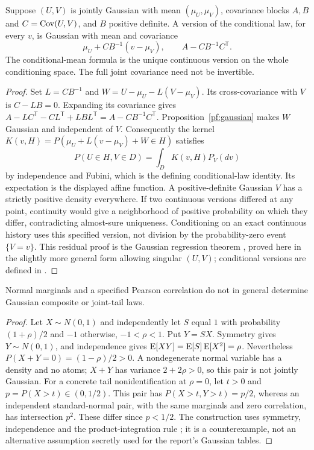 \begin{proposition}
\label{pf:conditioning}
Suppose \((U,V)\) is jointly Gaussian with mean \((\mu_U,\mu_V)\),
covariance blocks \(A,B\) and \(C=\operatorname{Cov}(U,V)\), and \(B\) positive
definite. A version of the conditional law, for every \(v\), is Gaussian
with mean and covariance
\[
 \mu_U+CB^{-1}(v-\mu_V),\qquad A-CB^{-1}C^{\mathsf T}.
\]
The conditional-mean formula is the unique continuous version on the
whole conditioning space. The full joint covariance need not be invertible.
\end{proposition}
\begin{proof}
Set \(L=CB^{-1}\) and
\(W=U-\mu_U-L(V-\mu_V)\). Its cross-covariance with \(V\) is
\(C-LB=0\). Expanding its covariance gives
\(A-LC^{\mathsf T}-CL^{\mathsf T}+LBL^{\mathsf T}
=A-CB^{-1}C^{\mathsf T}\). Proposition~\ref{pf:gaussian} makes
\(W\) Gaussian and independent of \(V\). Consequently the kernel
\(K(v,H)=P(\mu_U+L(v-\mu_V)+W\in H)\) satisfies
\[
 P(U\in H,V\in D)=\int_D K(v,H)P_V(dv)
\]
by independence and Fubini, which is the defining conditional-law identity.
Its expectation is the displayed affine function. A positive-definite
Gaussian \(V\) has a strictly positive density everywhere. If two
continuous versions differed at any point, continuity would give a
neighborhood of positive probability on which they differ, contradicting
almost-sure uniqueness. Conditioning on an exact continuous history uses
this specified version, not division by the probability-zero event
\(\{V=v\}\). This residual proof is the Gaussian regression theorem
\citep[Theorems 3.5.1--3.5.2]{gallager2013}, proved here in the slightly
more general form allowing singular \((U,V)\); conditional versions are
defined in \citet[Section 4.1]{durrett2019}.
\end{proof}

\begin{proposition}
\label{pf:normal-marginals}
Normal marginals and a specified Pearson correlation do not in general
determine Gaussian composite or joint-tail laws.
\end{proposition}
\begin{proof}
Let \(X\sim N(0,1)\) and independently let \(S\) equal \(1\) with
probability \((1+\rho)/2\) and \(-1\) otherwise, \(-1<\rho<1\).
Put \(Y=SX\). Symmetry gives \(Y\sim N(0,1)\), and independence gives
\(\operatorname{E}[XY]=\operatorname{E}[S]\operatorname{E}[X^2]=\rho\). Nevertheless
\(P(X+Y=0)=(1-\rho)/2>0\). A nondegenerate normal variable has a
density and no atoms; \(X+Y\) has variance \(2+2\rho>0\), so this
pair is not jointly Gaussian. For a concrete tail nonidentification at
\(\rho=0\), let \(t>0\) and \(p=P(X>t)\in(0,1/2)\). This pair
has \(P(X>t,Y>t)=p/2\), whereas an independent standard-normal pair,
with the same marginals and zero correlation, has intersection \(p^2\).
These differ since \(p<1/2\). The construction uses symmetry,
independence and the product-integration rule
\citep[Sections 1.7 and 2.1]{durrett2019}; it is a counterexample,
not an alternative assumption secretly used for the report's Gaussian tables.
\end{proof}

